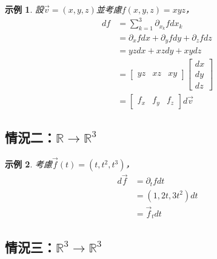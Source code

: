 \documentclass[12pt]{article}
\newtheorem*{example}{示例}
\begin{document}
    \begin{example}
        設$\vec{v}=(x,y,z)$並考慮$f(x,y,z)=xyz$，\begin{align*}
            df&=\sum_{k=1}^{3}\partial_{x_k}f dx_k\\
            &=\partial_x f dx + \partial_y f dy + \partial_z f dz\\
            &=yz dx+ xz dy + xy dz\\
            &=\begin{bmatrix}
                yz&xz&xy
            \end{bmatrix}\begin{bmatrix}
                dx\\dy\\dz
            \end{bmatrix}\\
            &=\begin{bmatrix}
                f_x&f_y&f_z
            \end{bmatrix}d\vec{v}
        \end{align*}
    \end{example}

    \subsection*{情況二：$\mathbb{R}\to\mathbb{R}^3$}

    \begin{example}
        考慮$\vec{f}(t)=(t,t^2,t^3)$，\begin{align*}
            d\vec{f}&=\partial_t f dt\\
            &=(1,2t,3t^2)dt\\
            &=\vec{f}_t dt
        \end{align*}
    \end{example}

    \subsection*{情況三：$\mathbb{R}^3\to\mathbb{R}^3$}
\end{document}

